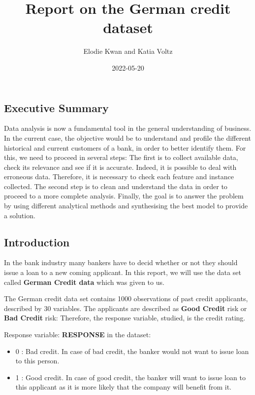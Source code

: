 \documentclass[
]{article}
\title{Report on the German credit dataset}
\author{Elodie Kwan and Katia Voltz}
\date{2022-05-20}
\providecommand{\tightlist}{%
  \setlength{\itemsep}{0pt}\setlength{\parskip}{0pt}}
\begin{document}
\maketitle

\hypertarget{executive-summary}{%
\subsection{Executive Summary}\label{executive-summary}}

Data analysis is now a fundamental tool in the general understanding of
business. In the current case, the objective would be to understand and
profile the different historical and current customers of a bank, in
order to better identify them. For this, we need to proceed in several
steps: The first is to collect available data, check its relevance and
see if it is accurate. Indeed, it is possible to deal with erroneous
data. Therefore, it is necessary to check each feature and instance
collected. The second step is to clean and understand the data in order
to proceed to a more complete analysis. Finally, the goal is to answer
the problem by using different analytical methods and synthesising the
best model to provide a solution.

\hypertarget{introduction}{%
\subsection{Introduction}\label{introduction}}

In the bank industry many bankers have to decid whether or not they
should issue a loan to a new coming applicant. In this report, we will
use the data set called \textbf{German Credit data} which was given to
us.

The German credit data set contains 1000 observations of past credit
applicants, described by 30 variables. The applicants are described as
\textbf{Good Credit} risk or \textbf{Bad Credit} risk: Therefore, the
response variable, studied, is the credit rating.

Response variable: \textbf{RESPONSE} in the dataset:

\begin{itemize}
\tightlist
\item
  0 : Bad credit. In case of bad credit, the banker would not want to
  issue loan to this person.
\item
  1 : Good credit. In case of good credit, the banker will want to issue
  loan to this applicant as it is more likely that the company will
  benefit from it.
\end{itemize}
\end{document}
